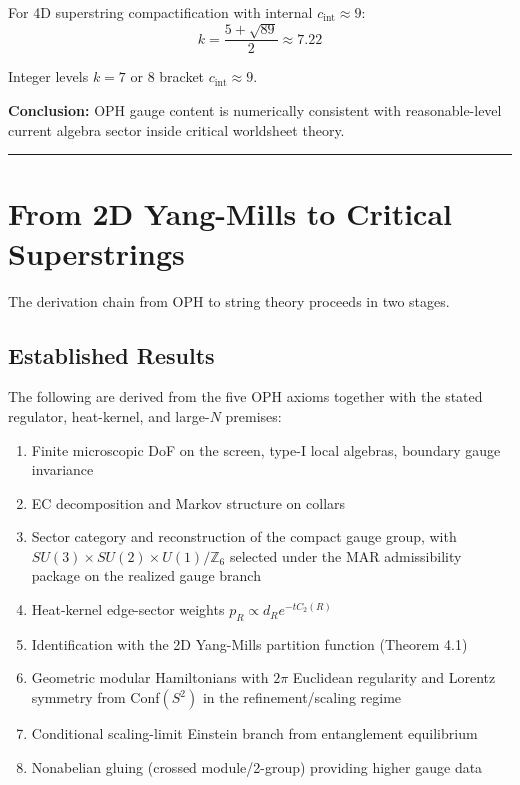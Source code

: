 For 4D superstring compactification with internal \(c_{\text{int}} \approx 9\): \[k = \frac{5 + \sqrt{89}}{2} \approx 7.22\]

Integer levels \(k = 7\) or \(8\) bracket \(c_{\text{int}} \approx 9\).

\textbf{Conclusion:} OPH gauge content is numerically consistent with reasonable-level current algebra sector inside critical worldsheet theory.

\begin{center}\rule{0.5\linewidth}{0.5pt}\end{center}

\section{From 2D Yang-Mills to Critical Superstrings}\label{9-from-2d-yang-mills-to-critical-superstrings}

The derivation chain from OPH to string theory proceeds in two stages.

\subsection{Established Results}\label{91-established-results}

The following are derived from the five OPH axioms together with the stated regulator, heat-kernel, and large-\(N\) premises:

\begin{enumerate}
\def\labelenumi{\arabic{enumi}.}
\tightlist
\item
  Finite microscopic DoF on the screen, type-I local algebras, boundary gauge invariance
\item
  EC decomposition and Markov structure on collars
\item
  Sector category and reconstruction of the compact gauge group, with \(SU(3) \times SU(2) \times U(1)/\mathbb{Z}_6\) selected under the MAR admissibility package on the realized gauge branch
\item
  Heat-kernel edge-sector weights \(p_R \propto d_R e^{-t C_2(R)}\)
\item
  Identification with the 2D Yang-Mills partition function (Theorem 4.1)
\item
  Geometric modular Hamiltonians with \(2\pi\) Euclidean regularity and Lorentz symmetry from Conf\((S^2)\) in the refinement/scaling regime
\item
  Conditional scaling-limit Einstein branch from entanglement equilibrium
\item
  Nonabelian gluing (crossed module/2-group) providing higher gauge data
\end{enumerate}

